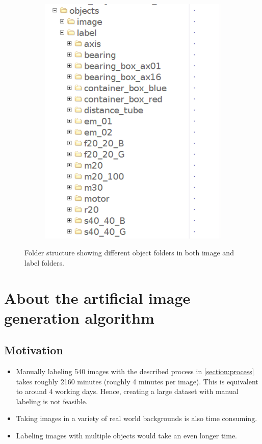 \begin{center}
\begin{figure}[!htb]
\begin{subfigure}{.5\textwidth}
			\includegraphics[width=1\linewidth]{images/folder_label}
			\label{Fig:fsilb}
		\end{subfigure}
		\caption{Folder structure showing different object folders in both image and label folders.}
		\label{Fig:fsil}
	\end{figure}
\end{center}

\section{About the artificial image generation algorithm}
\subsection{Motivation}
	\begin{itemize}
		\item Manually labeling 540 images with the described process in \ref{section:process} takes roughly 2160 minutes (roughly 4 minutes per image). This is equivalent to around 4 working days. Hence, creating a large dataset with manual labeling is not feasible.
		\item Taking images in a variety of real world backgrounds is also time consuming.
		\item Labeling images with multiple objects would take an even longer time.
	\end{itemize}
	

